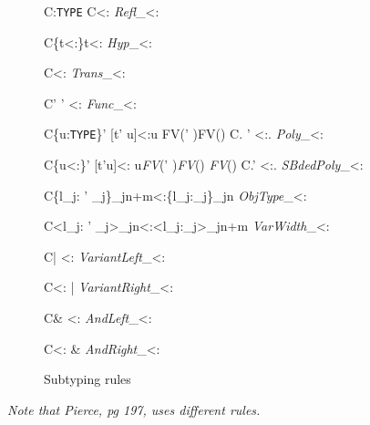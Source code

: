 \begin{figure}
\infrule
{C\vdash \tau :\texttt{TYPE}}
{C\vdash \tau <:\tau }
{}{\emph{Refl}_{<:}}

\axiom
{C\cup \{t<:\tau \}\vdash t<:\tau}
{\emph{Hyp}_{<:}}

{C\vdash \sigma <:\delta }
{}{\emph{Trans}_{<:}}

{C\vdash \sigma' \to \tau' <:\sigma \to \tau }
{}{\emph{Func}_{<:}}

\infrule
{C\cup \{u:\texttt{TYPE}\}\vdash \tau' [t' \mapsto u]<:\tau [t \mapsto u]
\qquad u\notin
FV(\tau' )\cup FV(\tau )}
{C\vdash {}. \tau' <:.\tau }
{}{\emph{Poly}_{<:}}

\infrulebig
{C\cup \{u<:\gamma \}\vdash \tau' [t'\mapsto u]<:\tau [t \mapsto u]
\qquad
u\notin \textit{FV}(\tau' )\cup \textit{FV}(\tau ) \cup \textit{FV}(\gamma)}
{C\vdash {}.\tau' <:. \tau }
{}{\emph{SBdedPoly}_{<:}}

 {C\vdash \{l_j: \tau' _j\}_{j\leq n+m}<:\{l_j:\tau _j\}_{j\leq n}}
{}{\emph{ObjType}_{<:}}

 {C\vdash <l_j: \tau' _j>_{j\leq n}<:<l_j:\tau _j>_{j\leq n+m}}
{}{\emph{VarWidth}_{<:}}

 {C\vdash \sigma | \tau <: \gamma}
{}{\emph{VariantLeft}_{<:}}

 {C\vdash \gamma <: \sigma | \tau}
{}{\emph{VariantRight}_{<:}}

 {C\vdash \sigma \& \tau <: \gamma}
{}{\emph{AndLeft}_{<:}}

 {C\vdash \gamma <: \sigma \& \tau}
{}{\emph{AndRight}_{<:}}


\caption{Subtyping rules}\label{app::subtype}
\end{figure}

\emph{Note that Pierce, pg 197, uses different rules.}